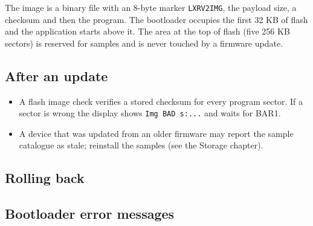 The image is a binary file with an 8-byte marker \texttt{LXRV2IMG}, the
payload size, a checksum and then the program. The bootloader occupies
the first 32 KB of flash and the application starts above it. The area
at the top of flash (five 256 KB sectors) is reserved for samples and is
never touched by a firmware update.

\subsection{After an update}\label{after-an-update}

\begin{itemize}
\tightlist
\item
  A flash image check verifies a stored checksum for every program
  sector. If a sector is wrong the display shows
  \texttt{Img\ BAD\ s:...} and waits for BAR1.
\item
  A device that was updated from an older firmware may report the sample
  catalogue as stale; reinstall the samples (see the Storage chapter).
\end{itemize}

\subsection{Rolling back}\label{rolling-back}



\subsection{Bootloader error messages}\label{bootloader-error-messages}

